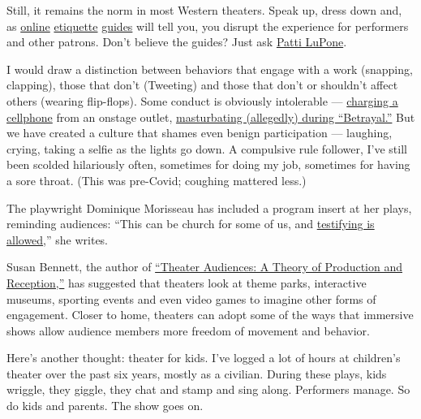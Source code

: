 Still, it remains the norm in most Western theaters. Speak up, dress
down and, as
\href{https://broadwaydirect.com/theater-etiquette-dos-donts-attending-broadway/}{online}
\href{https://www.townandcountrymag.com/leisure/arts-and-culture/a29402504/broadway-theater-new-etiquette-rules/}{etiquette}
\href{https://www.playbill.com/article/15-pieces-of-theatre-etiquette}{guides}
will tell you, you disrupt the experience for performers and other
patrons. Don't believe the guides? Just ask
\href{https://www.nytimes3xbfgragh.onion/2015/07/10/theater/hold-the-phone-its-patti-lupone.html}{Patti
LuPone}.

I would draw a distinction between behaviors that engage with a work
(snapping, clapping), those that don't (Tweeting) and those that don't
or shouldn't affect others (wearing flip-flops). Some conduct is
obviously intolerable ---
\href{https://www.theguardian.com/stage/2015/jul/07/broadway-hand-to-god-cellphone-charge-fake-outlet}{charging
a cellphone} from an onstage outlet,
\href{https://pagesix.com/2019/09/16/did-a-woman-orgasm-during-tom-hiddlestons-broadway-show/?_ga=2.199376814.1633250828.1568634805-1265972161.1561034448}{masturbating
(allegedly) during ``Betrayal.''} But we have created a culture that
shames even benign participation --- laughing, crying, taking a selfie
as the lights go down. A compulsive rule follower, I've still been
scolded hilariously often, sometimes for doing my job, sometimes for
having a sore throat. (This was pre-Covid; coughing mattered less.)

The playwright Dominique Morisseau has included a program insert at her
plays, reminding audiences: ``This can be church for some of us, and
\href{about:blank}{testifying is allowed},'' she writes.

Susan Bennett, the author of
\href{https://books.google.com/books/about/Theatre_Audiences.html?id=3vqRbjkvvr4C}{``Theater
Audiences: A Theory of Production and Reception,''} has suggested that
theaters look at theme parks, interactive museums, sporting events and
even video games to imagine other forms of engagement. Closer to home,
theaters can adopt some of the ways that immersive shows allow audience
members more freedom of movement and behavior.

Here's another thought: theater for kids. I've logged a lot of hours at
children's theater over the past six years, mostly as a civilian. During
these plays, kids wriggle, they giggle, they chat and stamp and sing
along. Performers manage. So do kids and parents. The show goes on.

